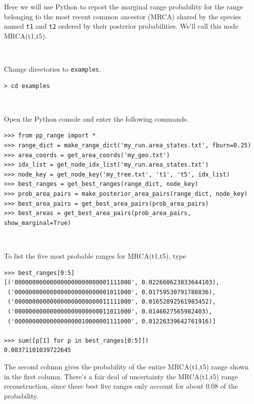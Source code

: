 \documentclass[11pt]{article}
\newcommand{\impmark}{\strut\vadjust{\domark}}
\newcommand{\domark}{%
  \vbox to 0pt{
    \kern-\dp\strutbox
    \smash{\llap{$\rightarrow$\kern1em}}
    \vss
  }%
}
\begin{document}
Here we will use Python to report the marginal range probability for the range belonging to the most recent common ancestor (MRCA) shared by the species named \texttt{t1} and \texttt{t2} ordered by their posterior probabilities. We'll call this node MRCA(t1,t5).

\noindent \\ \impmark Change directories to \texttt{examples}.

\begin{framed}
\begin{lstlisting}
> cd examples
\end{lstlisting}
\end{framed}

\noindent \\ \impmark Open the Python console and enter the following commands.

\begin{framed}
\begin{lstlisting}
>>> from pp_range import *
>>> range_dict = make_range_dict('my_run.area_states.txt', fburn=0.25)
>>> area_coords = get_area_coords('my_geo.txt')
>>> idx_list = get_node_idx_list('my_run.area_states.txt')
>>> node_key = get_node_key('my_tree.txt', 't1', 't5', idx_list)
>>> best_ranges = get_best_ranges(range_dict, node_key)
>>> prob_area_pairs = make_posterior_area_pairs(range_dict, node_key)
>>> best_area_pairs = get_best_area_pairs(prob_area_pairs)
>>> best_areas = get_best_area_pairs(prob_area_pairs, show_marginal=True)
\end{lstlisting}
\end{framed}

\noindent \\ \impmark To list the five most probable ranges for MRCA(t1,t5), type
\begin{framed}
\begin{lstlisting}
>>> best_ranges[0:5]
[('000000000000000000000000001111000', 0.022660623833644103),
 ('000000000000000000000000001011000', 0.01759530791788836),
 ('000000000000000000000000011111000', 0.01652892561983452),
 ('000000000000000000000000011011000', 0.0146627565982403),
 ('000000000000000000010000001111000', 0.01226339642761916)]

>>> sum([p[1] for p in best_ranges[0:5]])
0.08371101039722645
\end{lstlisting}
\end{framed}

The second column gives the probability of the entire MRCA(t1,t5) range shown in the first column.
There's a fair deal of uncertainty the MRCA(t1,t5) range reconstruction, since these best five ranges only account for about 0.08 of the probability.
\end{document}

